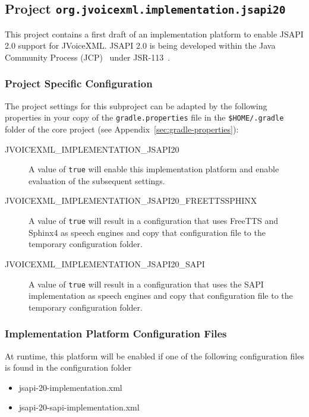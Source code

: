 \documentclass[11pt,a4paper]{article}
\begin{document}
\subsection{Project \texttt{org.jvoicexml.implementation.jsapi20}}
\label{sec:implementation-jsapi20}

This project contains a first draft of an implementation platform to enable
JSAPI 2.0 support for JVoiceXML. JSAPI 2.0 is being developed within the Java 
Community Process (JCP)~\cite{jcp} under JSR-113~\cite{jcp:jsr113}.

\subsubsection{Project Specific Configuration}

The project settings for this subproject can be adapted by the following 
properties in your copy of the \texttt{gradle.properties} file in the
\texttt{\${HOME}/.gradle} folder of the core project (see 
Appendix~\ref{sec:gradle-properties}):

\begin{description}
\item[JVOICEXML\_IMPLEMENTATION\_JSAPI20] A value of \texttt{true} will enable this implementation
platform and enable evaluation of the subsequent settings.
\item[JVOICEXML\_IMPLEMENTATION\_JSAPI20\_FREETTSSPHINX] A value of \texttt{true} will result in a
configuration that uses FreeTTS and Sphinx4 as speech engines and copy that configuration file to the temporary
configuration folder.
\item[JVOICEXML\_IMPLEMENTATION\_JSAPI20\_SAPI]  A value of \texttt{true} will result in a
configuration that uses the SAPI implementation as speech engines and copy that configuration file to the temporary
configuration folder.
\end{description}

\subsubsection{Implementation Platform Configuration Files}

At runtime, this platform will be enabled if one of the following configuration files is found in the configuration
folder
\begin{itemize}
\item jsapi-20-implementation.xml
\item jsapi-20-sapi-implementation.xml
\end{itemize}
\end{document}
